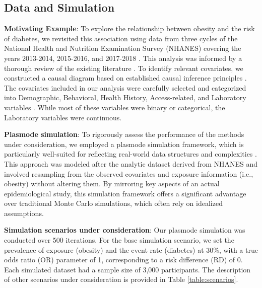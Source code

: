 \documentclass[sn-vancouver,Numbered,lineno,pdflatex]{sn-jnl}
\begin{document}
\subsection*{Data and Simulation}\label{data-and-simulation}

\textbf{Motivating Example}: To explore the relationship between obesity
and the risk of diabetes, we revisited this association using data from
three cycles of the National Health and Nutrition Examination Survey
(NHANES) covering the years 2013-2014, 2015-2016, and 2017-2018
\citep{karim2024high}. This analysis was informed by a thorough review
of the existing literature
\citep{saydah2014trends, liu2013association, kabadi2012joint, ostchega2012abdominal}.
To identify relevant covariates, we constructed a causal diagram based
on established causal inference principles \citep{greenland1999causal}.
The covariates included in our analysis were carefully selected and
categorized into Demographic, Behavioral, Health History,
Access-related, and Laboratory variables \citep{karim2024high}. While
most of these variables were binary or categorical, the Laboratory
variables were continuous.

\textbf{Plasmode simulation}: To rigorously assess the performance of
the methods under consideration, we employed a plasmode simulation
framework, which is particularly well-suited for reflecting real-world
data structures and complexities \citep{franklin2014plasmode}. This
approach was modeled after the analytic dataset derived from NHANES and
involved resampling from the observed covariates and exposure
information (i.e., obesity) without altering them. By mirroring key
aspects of an actual epidemiological study, this simulation framework
offers a significant advantage over traditional Monte Carlo simulations,
which often rely on idealized assumptions.

\textbf{Simulation scenarios under consideration}: Our plasmode
simulation was conducted over 500 iterations. For the base simulation
scenario, we set the prevalence of exposure (obesity) and the event rate
(diabetes) at 30\%, with a true odds ratio (OR) parameter of 1,
corresponding to a risk difference (RD) of 0. Each simulated dataset had
a sample size of 3,000 participants. The description of other scenarios
under consideration is provided in Table \ref{table:scenarios}.
\end{document}
